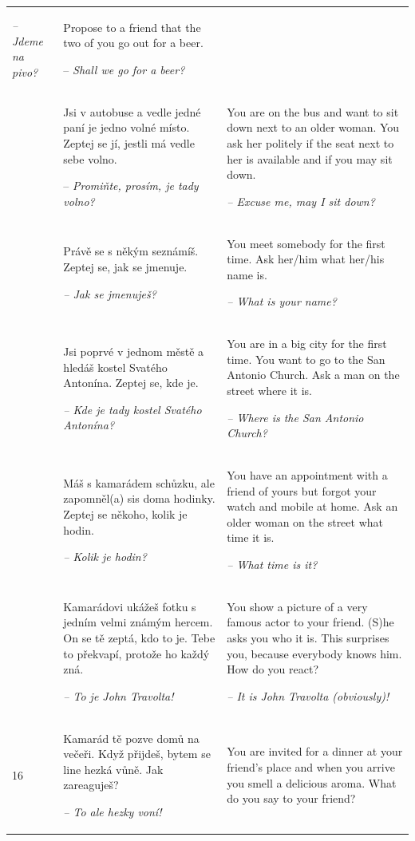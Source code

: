 \begin{xltabular}{\textwidth}{lQQ}
\textit{-- Jdeme na pivo?} & Propose to a friend that the two of you go out for a beer.

-- \textit{Shall we go for a beer?}\\
 & Jsi v autobuse a vedle jedné paní je jedno volné místo. Zeptej se jí, jestli má vedle sebe volno.

-- \textit{Promiňte, prosím, je tady volno?} & You are on the bus and want to sit down next to an older woman. You ask her politely if the seat next to her is available and if you may sit down.

{\itshape -- Excuse me, may I sit down?}\\
 & Právě se s někým seznámíš. Zeptej se, jak se jmenuje.

{\itshape -- Jak se jmenuješ?} & You meet somebody for the first time. Ask her/him what her/his name is.

{\itshape -- What is your name?}\\
 & Jsi poprvé v jednom městě a hledáš kostel Svatého Antonína. Zeptej se, kde je.

{\itshape -- Kde je tady kostel Svatého Antonína?} & You are in a big city for the first time. You want to go to the San Antonio Church. Ask a man on the street where it is.

{\itshape -- Where is the San Antonio Church?}\\
 & Máš s kamarádem schůzku, ale zapomněl(a) sis doma hodinky. Zeptej se někoho, kolik je hodin.

{\itshape -- Kolik je hodin?} & You have an appointment with a friend of yours but forgot your watch and mobile at home. Ask an older woman on the street what time it is.

{\itshape -- What time is it?}\\
 & Kamarádovi ukážeš fotku s jedním velmi známým hercem. On se tě zeptá, kdo to je. Tebe to překvapí, protože ho každý zná.

{\itshape -- To je John Travolta!} & You show a picture of a very famous actor to your friend. (S)he asks you who it is. This surprises you, because everybody knows him. How do you react?

{\itshape -- It is John Travolta (obviously)!}\\
16 & Kamarád tě pozve domů na večeři. Když přijdeš, bytem se line hezká vůně. Jak zareaguješ?

{\itshape -- To ale hezky voní!} & You are invited for a dinner at your friend’s place and when you arrive you smell a delicious aroma. What do you say to your friend?


\end{xltabular}

